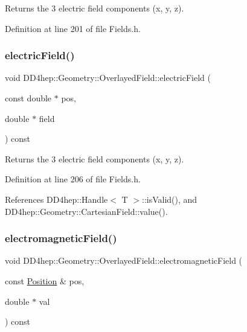 Returns the 3 electric field components (x, y, z). 



Definition at line 201 of file Fields.\+h.

\hypertarget{class_d_d4hep_1_1_geometry_1_1_overlayed_field_aab3125e34e32d2440850b3a78c0b7a03}{}\label{class_d_d4hep_1_1_geometry_1_1_overlayed_field_aab3125e34e32d2440850b3a78c0b7a03} 
\subsubsection{\texorpdfstring{electric\+Field()}{electricField()}\hspace{0.1cm}{\footnotesize\ttfamily [3/3]}}
{\footnotesize\ttfamily void D\+D4hep\+::\+Geometry\+::\+Overlayed\+Field\+::electric\+Field (\begin{DoxyParamCaption}\item[{const double $\ast$}]{pos,  }\item[{double $\ast$}]{field }\end{DoxyParamCaption}) const\hspace{0.3cm}{\ttfamily [inline]}}



Returns the 3 electric field components (x, y, z). 



Definition at line 206 of file Fields.\+h.



References D\+D4hep\+::\+Handle$<$ T $>$\+::is\+Valid(), and D\+D4hep\+::\+Geometry\+::\+Cartesian\+Field\+::value().

\hypertarget{class_d_d4hep_1_1_geometry_1_1_overlayed_field_ac729f9f8cc7e8df1d5be1cd5a5431bf2}{}\label{class_d_d4hep_1_1_geometry_1_1_overlayed_field_ac729f9f8cc7e8df1d5be1cd5a5431bf2} 
\subsubsection{\texorpdfstring{electromagnetic\+Field()}{electromagneticField()}\hspace{0.1cm}{\footnotesize\ttfamily [1/2]}}
{\footnotesize\ttfamily void D\+D4hep\+::\+Geometry\+::\+Overlayed\+Field\+::electromagnetic\+Field (\begin{DoxyParamCaption}\item[{const \hyperlink{namespace_d_d4hep_1_1_geometry_a55083902099d03506c6db01b80404900}{Position} \&}]{pos,  }\item[{double $\ast$}]{val }\end{DoxyParamCaption}) const\hspace{0.3cm}{\ttfamily [inline]}}



